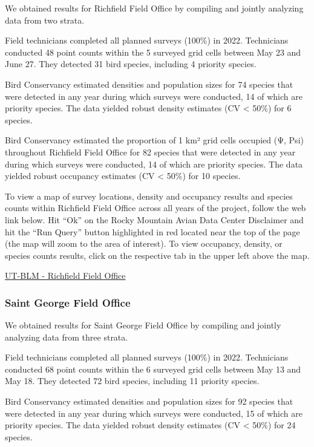 \documentclass[
  letterpaper,
  DIV=11,
  numbers=noendperiod,
  oneside]{scrreprt}
\begin{document}
We obtained results for Richfield Field Office by compiling and jointly
analyzing data from two strata.

Field technicians completed all planned surveys (100\%) in 2022.
Technicians conducted 48 point counts within the 5 surveyed grid cells
between May 23 and June 27. They detected 31 bird species, including 4
priority species.

Bird Conservancy estimated densities and population sizes for 74 species
that were detected in any year during which surveys were conducted, 14
of which are priority species. The data yielded robust density estimates
(CV \textless{} 50\%) for 6 species.

Bird Conservancy estimated the proportion of 1 km² grid cells occupied
(Ψ, Psi) throughout Richfield Field Office for 82 species that were
detected in any year during which surveys were conducted, 14 of which
are priority species. The data yielded robust occupancy estimates (CV
\textless{} 50\%) for 10 species.

To view a map of survey locations, density and occupancy results and
species counts within Richfield Field Office across all years of the
project, follow the web link below. Hit ``Ok'' on the Rocky Mountain
Avian Data Center Disclaimer and hit the ``Run Query'' button
highlighted in red located near the top of the page (the map will zoom
to the area of interest). To view occupancy, density, or species counts
results, click on the respective tab in the upper left above the map.

\href{http://www.rmbo.org/new_site/adc/QueryWindow.aspx\#N4IgzgrgDgpgTmALnAhoiBbEAuABCAVQBUBaAIQBkBZXE3AJQEsBjACwDNGYAbAE1wBiXPrgDy7TsxggAvkA}{UT-BLM
- Richfield Field Office}

\hypertarget{saint-george-field-office}{%
\subsubsection{Saint George Field
Office}\label{saint-george-field-office}}

We obtained results for Saint George Field Office by compiling and
jointly analyzing data from three strata.

Field technicians completed all planned surveys (100\%) in 2022.
Technicians conducted 68 point counts within the 6 surveyed grid cells
between May 13 and May 18. They detected 72 bird species, including 11
priority species.

Bird Conservancy estimated densities and population sizes for 92 species
that were detected in any year during which surveys were conducted, 15
of which are priority species. The data yielded robust density estimates
(CV \textless{} 50\%) for 24 species.
\end{document}
